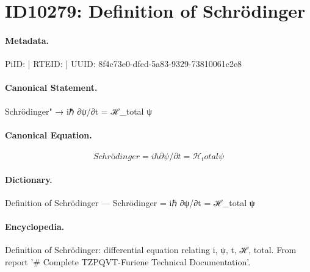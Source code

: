 \section*{ID10279: Definition of Schrödinger}
\paragraph{Metadata.}
PiID:  | RTEID:  | UUID: 8f4c73e0-dfed-5a83-9329-73810061c2e8

\paragraph{Canonical Statement.}
Schrödinger" → iℏ ∂ψ/∂t = ℋ\_total ψ

\paragraph{Canonical Equation.}
\[
Schrödinger = iℏ ∂ψ/∂t = ℋ_total ψ
\]

\paragraph{Dictionary.}
Definition of Schrödinger — Schrödinger = iℏ ∂ψ/∂t = ℋ\_total ψ

\paragraph{Encyclopedia.}
Definition of Schrödinger: differential equation relating i, ψ, t, ℋ, total. From report '\# Complete TZPQVT-Furiene Technical Documentation'.
